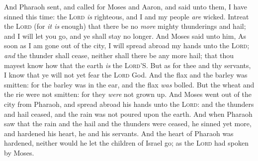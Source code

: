 \documentclass[11pt,letterpaper,oneside]{memoir}
\begin{document}
And Pharaoh sent, and called for Moses and Aaron, and said unto them, I
have sinned this time: the \textsc{Lord} \emph{is} righteous, and I and
my people \emph{are} wicked. Intreat the \textsc{Lord} (for \emph{it is}
enough) that there be no \emph{more} mighty thunderings and hail; and I
will let you go, and ye shall stay no longer. And Moses said unto him,
As soon as I am gone out of the city, I will spread abroad my hands unto
the \textsc{Lord}; \emph{and} the thunder shall cease, neither shall
there be any more hail; that thou mayest know how that the earth
\emph{is} the \textsc{Lord}'S. But as for thee and thy servants, I know
that ye will not yet fear the \textsc{Lord} God. And the flax and the
barley was smitten: for the barley was in the ear, and the flax
\emph{was} bolled. But the wheat and the rie were not smitten: for they
\emph{were} not grown up. And Moses went out of the city from Pharaoh,
and spread abroad his hands unto the \textsc{Lord}: and the thunders and
hail ceased, and the rain was not poured upon the earth. And when
Pharaoh saw that the rain and the hail and the thunders were ceased, he
sinned yet more, and hardened his heart, he and his servants. And the
heart of Pharaoh was hardened, neither would he let the children of
Israel go; as the \textsc{Lord} had spoken by Moses.
\end{document}
